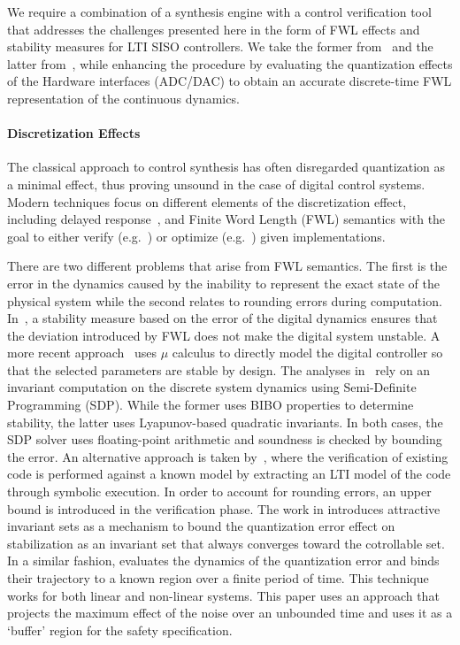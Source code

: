 \documentclass[runningheads,a4paper]{llncs}
\begin{document}
We require a combination of a synthesis engine with a control
verification tool that addresses the challenges presented here in the
form of FWL effects and stability measures for LTI SISO controllers.
We take the former from~\cite{DBLP:conf/lpar/DavidKL15} and the latter
from~\cite{daes20161}, while enhancing the procedure by evaluating the
quantization effects of the Hardware interfaces (ADC/DAC) to obtain an
accurate discrete-time FWL representation of the continuous dynamics.

\paragraph{Discretization Effects}

The classical approach to control synthesis has often disregarded
quantization as a minimal effect, thus proving unsound in the case of digital control systems.
Modern techniques focus on different elements of the discretization effect, including delayed
response~\cite{Duggirala2015}, and Finite Word Length (FWL) semantics with
the goal to either verify (e.g.~\cite{daes20161}) or optimize
(e.g.~\cite{oudjida2014design}) given implementations.

There are two different problems that arise from FWL semantics.  The first
is the error in the dynamics caused by the inability to represent the exact
state of the physical system while the second relates to rounding errors
during computation.  In~\cite{fialho1994stability}, a stability measure
based on the error of the digital dynamics ensures that the deviation
introduced by FWL does not make the digital system unstable.  A more recent
approach~\cite{DBLP:journals/automatica/WuLCC09} uses $\mu$ calculus to
directly model the digital controller so that the selected parameters are
stable by design.  The analyses
in~\cite{DBLP:conf/hybrid/WangGRJF16,DBLP:conf/hybrid/RouxJG15} rely on an
invariant computation on the discrete system dynamics using Semi-Definite
Programming (SDP).  While the former uses BIBO properties to determine
stability, the latter uses Lyapunov-based quadratic invariants.  In both
cases, the SDP solver uses floating-point arithmetic and soundness is
checked by bounding the error.  An alternative approach is taken
by~\cite{park2016scalable}, where the verification of existing code is
performed against a known model by extracting an LTI model of the code
through symbolic execution.  In order to account for rounding errors, an
upper bound is introduced in the verification phase.
The work in \cite{picasso2002construction,picasso2003stabilization} introduces
attractive invariant sets as a mechanism to bound the quantization error effect
on stabilization as an invariant set that always converges toward the cotrollable
set. In a similar fashion, \cite{liberzon2003hybrid} evaluates the dynamics of the
quantization error and binds their trajectory to a known region over a finite
period of time. This technique works for both linear and non-linear systems.
This paper uses an approach that projects the maximum effect of the noise over
an unbounded time and uses it as a `buffer' region for the safety specification.
\end{document}

